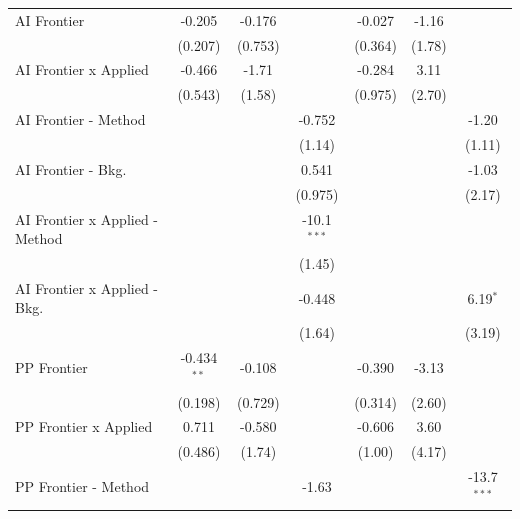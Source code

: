 \begin{tabular}{lcccccc}
   AI Frontier                    & -0.205        & -0.176       &               & -0.027  & -1.16         &   \\   
                                  & (0.207)       & (0.753)      &               & (0.364) & (1.78)        &   \\   
   AI Frontier x Applied          & -0.466        & -1.71        &               & -0.284  & 3.11          &   \\   
                                  & (0.543)       & (1.58)       &               & (0.975) & (2.70)        &   \\   
   AI Frontier - Method           &               &              & -0.752        &         &               & -1.20\\   
                                  &               &              & (1.14)        &         &               & (1.11)\\   
   AI Frontier - Bkg.             &               &              & 0.541         &         &               & -1.03\\   
                                  &               &              & (0.975)       &         &               & (2.17)\\   
   AI Frontier x Applied - Method &               &              & -10.1$^{***}$ &         &               &   \\   
                                  &               &              & (1.45)        &         &               &   \\   
   AI Frontier x Applied - Bkg.   &               &              & -0.448        &         &               & 6.19$^{*}$\\   
                                  &               &              & (1.64)        &         &               & (3.19)\\   
   PP Frontier                    & -0.434$^{**}$ & -0.108       &               & -0.390  & -3.13         &   \\   
                                  & (0.198)       & (0.729)      &               & (0.314) & (2.60)        &   \\   
   PP Frontier x Applied          & 0.711         & -0.580       &               & -0.606  & 3.60          &   \\   
                                  & (0.486)       & (1.74)       &               & (1.00)  & (4.17)        &   \\   
   PP Frontier - Method           &               &              & -1.63         &         &               & -13.7$^{***}$\\   

\end{tabular}
